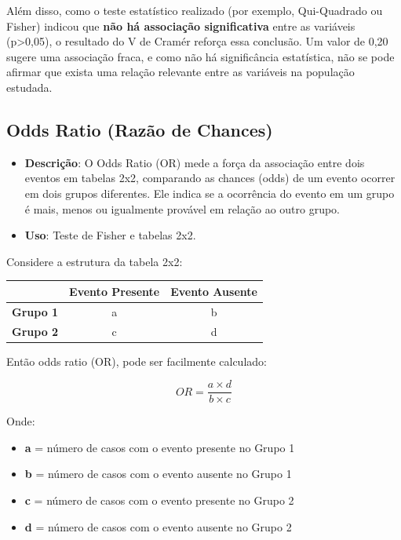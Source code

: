 \documentclass[
]{book}
\newcounter{none} %
\providecommand{\tightlist}{%
  \setlength{\itemsep}{0pt}\setlength{\parskip}{0pt}}
\begin{document}
Além disso, como o teste estatístico realizado (por exemplo, Qui-Quadrado ou Fisher) indicou que \textbf{não há associação significativa} entre as variáveis (p\textgreater0,05), o resultado do V de Cramér reforça essa conclusão. Um valor de 0,20 sugere uma associação fraca, e como não há significância estatística, não se pode afirmar que exista uma relação relevante entre as variáveis na população estudada.

\subsection{Odds Ratio (Razão de Chances)}\label{odds-ratio-razuxe3o-de-chances}

\begin{itemize}
\item
  \textbf{Descrição}: O Odds Ratio (OR) mede a força da associação entre dois eventos em tabelas 2x2, comparando as chances (odds) de um evento ocorrer em dois grupos diferentes. Ele indica se a ocorrência do evento em um grupo é mais, menos ou igualmente provável em relação ao outro grupo.
\item
  \textbf{Uso}: Teste de Fisher e tabelas 2x2.
\end{itemize}

Considere a estrutura da tabela 2x2:

{\def\LTcaptype{none} %
\begin{longtable}[]{@{}lcc@{}}
\toprule\noalign{}
& Evento Presente & Evento Ausente \\
\midrule\noalign{}
\endhead
\bottomrule\noalign{}
\endlastfoot
\textbf{Grupo 1} & a & b \\
\textbf{Grupo 2} & c & d \\
\end{longtable}
}

Então odds ratio (OR), pode ser facilmente calculado:

\[
OR = \frac{a \times d}{b \times c}
\]

Onde:

\begin{itemize}
\tightlist
\item
  \textbf{a} = número de casos com o evento presente no Grupo 1\\
\item
  \textbf{b} = número de casos com o evento ausente no Grupo 1\\
\item
  \textbf{c} = número de casos com o evento presente no Grupo 2\\
\item
  \textbf{d} = número de casos com o evento ausente no Grupo 2
\end{itemize}
\end{document}
